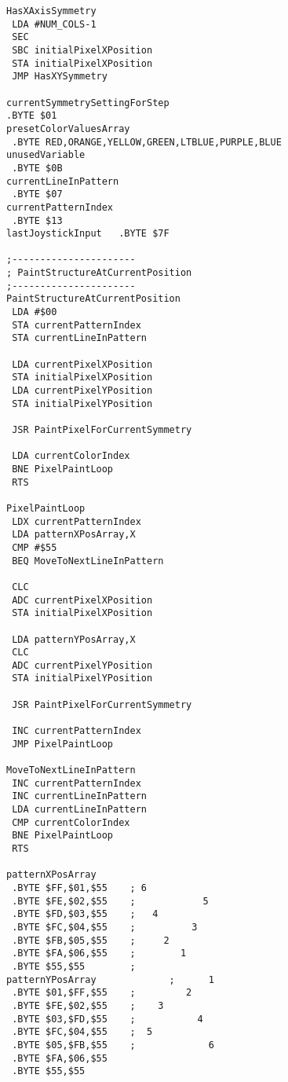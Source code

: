 \begin{minipage}[b]{0.33\linewidth}
\begin{lrbox}{\mybox}%
\begin{lstlisting}[basicstyle=\ttfamily\tiny]
HasXAxisSymmetry   
 LDA #NUM_COLS-1
 SEC 
 SBC initialPixelXPosition
 STA initialPixelXPosition
 JMP HasXYSymmetry

currentSymmetrySettingForStep
.BYTE $01
presetColorValuesArray        
 .BYTE RED,ORANGE,YELLOW,GREEN,LTBLUE,PURPLE,BLUE
unusedVariable                
 .BYTE $0B
currentLineInPattern          
 .BYTE $07
currentPatternIndex           
 .BYTE $13
lastJoystickInput   .BYTE $7F

;----------------------
; PaintStructureAtCurrentPosition
;----------------------
PaintStructureAtCurrentPosition   
 LDA #$00
 STA currentPatternIndex
 STA currentLineInPattern

 LDA currentPixelXPosition
 STA initialPixelXPosition
 LDA currentPixelYPosition
 STA initialPixelYPosition

 JSR PaintPixelForCurrentSymmetry

 LDA currentColorIndex
 BNE PixelPaintLoop
 RTS 

PixelPaintLoop   
 LDX currentPatternIndex
 LDA patternXPosArray,X
 CMP #$55
 BEQ MoveToNextLineInPattern

 CLC 
 ADC currentPixelXPosition
 STA initialPixelXPosition

 LDA patternYPosArray,X
 CLC 
 ADC currentPixelYPosition
 STA initialPixelYPosition

 JSR PaintPixelForCurrentSymmetry

 INC currentPatternIndex
 JMP PixelPaintLoop

MoveToNextLineInPattern   
 INC currentPatternIndex
 INC currentLineInPattern
 LDA currentLineInPattern
 CMP currentColorIndex
 BNE PixelPaintLoop
 RTS 

patternXPosArray             
 .BYTE $FF,$01,$55    ; 6              
 .BYTE $FE,$02,$55    ;            5   
 .BYTE $FD,$03,$55    ;   4            
 .BYTE $FC,$04,$55    ;          3     
 .BYTE $FB,$05,$55    ;     2          
 .BYTE $FA,$06,$55    ;        1       
 .BYTE $55,$55        ;                
patternYPosArray             ;      1         
 .BYTE $01,$FF,$55    ;         2      
 .BYTE $FE,$02,$55    ;    3           
 .BYTE $03,$FD,$55    ;           4    
 .BYTE $FC,$04,$55    ;  5             
 .BYTE $05,$FB,$55    ;             6 
 .BYTE $FA,$06,$55
 .BYTE $55,$55



\end{lstlisting}
\end{lrbox}
\end{minipage}
